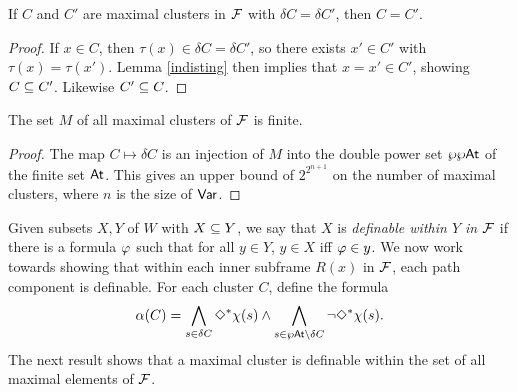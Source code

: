 \begin{corollary} \label{equalC}
If $C$ and $C'$ are maximal clusters in $\mathcal{F}$ with $\delta C=\delta C'$, then $C=C'$.
\end{corollary}
\begin{proof}
If $x\in C$, then $\tau(x)\in\delta C=\delta C'$, so there exists $x'\in C'$ with $\tau(x)=\tau(x')$. Lemma \ref{indisting} then implies that 
$x=x'\in C'$, showing $C\subseteq C'$.  Likewise $C'\subseteq C$.
\end{proof}

\begin{corollary} \label{finmaxcl}
The set $M$ of all maximal clusters of $\mathcal{F}$ is finite.
\end{corollary}
\begin{proof}
The map $C\mapsto\delta C$ is an injection of $M$ into the double power set $\wp\wp\mathsf{At}$ of the finite set $\mathsf{At}$. This gives an upper bound of $2^{2^{n+1}}$ on the number of maximal clusters, where $n$ is the size of $\mathsf{Var}$.
\end{proof}

Given subsets $X,Y$ of $W$ with $X\subseteq Y$, we say that $X$ is \emph{definable within $Y$ in $\mathcal{F}$} if there is a formula $\varphi$ such that for all $y\in Y$, $y\in X$ iff $\varphi\in y$.
We now work towards showing that within each inner subframe $R(x)$ in $\mathcal{F}$, each path component is definable. For each cluster $C$, define the formula
$$
\alpha(C)=  \bigwedge_{s\in \delta C}\Diamond^*\chi(s)\land\bigwedge_{s\in \wp\mathsf{At}\setminus \delta C}\neg\Diamond^*\chi(s).
$$
The next result shows that a maximal cluster is definable within the set of all maximal elements of $\mathcal{F}$.

